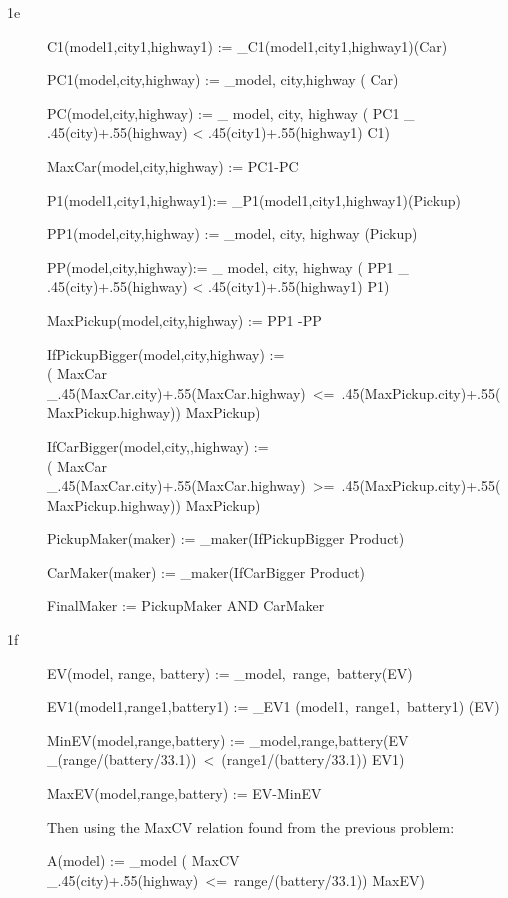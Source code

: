 \documentclass[12pt]{article}
\begin{document}
\begin{description}
\clearpage
\item[1e ] $ $ \\
C1(model1,city1,highway1) := \rho_{C1}(model1,city1,highway1)(Car)


PC1(model,city,highway) := \pi_{model, city,highway} ( Car)


PC(model,city,highway) := \pi_{ model, city, highway} ( PC1 \bowtie_{ .45(city)+.55(highway) < .45(city1)+.55(highway1)} C1)


MaxCar(model,city,highway) :=  PC1-PC


P1(model1,city1,highway1):= \rho_{P1}(model1,city1,highway1)(Pickup)


PP1(model,city,highway) := \pi_{model, city, highway} (Pickup)


PP(model,city,highway):= \pi_{ model, city, highway} ( PP1 \bowtie_{ .45(city)+.55(highway) < .45(city1)+.55(highway1)} P1)


MaxPickup(model,city,highway) := PP1 -PP

IfPickupBigger(model,city,highway) :=\\  
( MaxCar \bowtie_{.45(MaxCar.city)+.55(MaxCar.highway)\ <=\ .45(MaxPickup.city)+.55(MaxPickup.highway))} MaxPickup)

IfCarBigger(model,city,,highway) :=\\
( MaxCar \bowtie_{.45(MaxCar.city)+.55(MaxCar.highway)\ >=\ .45(MaxPickup.city)+.55(MaxPickup.highway))} MaxPickup)

PickupMaker(maker) := \pi_{maker}(IfPickupBigger \bowtie Product) 

CarMaker(maker) := \pi_{maker}(IfCarBigger \bowtie Product)

FinalMaker := PickupMaker AND CarMaker




\clearpage
\item[1f ] $ $ \\

EV(model, range, battery) := \pi_{model,\ range,\ battery}(EV)

EV1(model1,range1,battery1) := \rho_{EV1} (model1,\ range1,\ battery1) (EV)

MinEV(model,range,battery) := \pi_{model,range,battery}(EV \bowtie_{(range/(battery/33.1))\ <\ (range1/(battery/33.1))} EV1)

MaxEV(model,range,battery) :=  EV-MinEV

Then using the MaxCV relation found from the previous problem:

A(model) := \pi_{model} ( MaxCV \bowtie_{.45(city)+.55(highway)\ <=\ range/(battery/33.1))} MaxEV)


\end{description}
\end{document}
